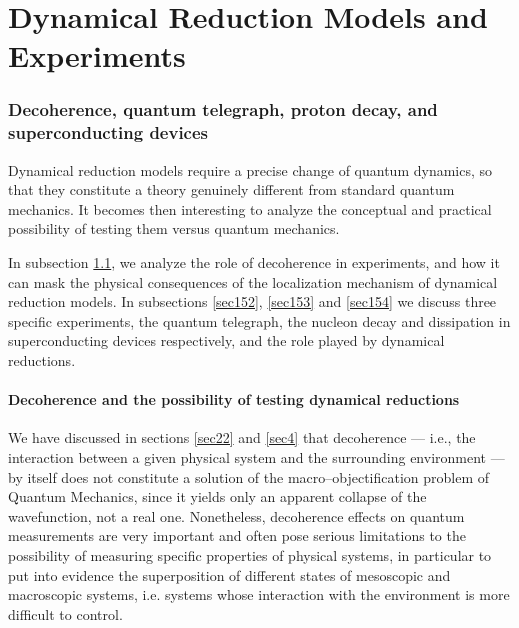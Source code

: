 \documentclass[10pt,a4paper]{article}
\begin{document}
\part{Dynamical Reduction Models and Experiments}

\section{Decoherence, quantum telegraph, proton decay, and
superconducting devices} \label{sec15}


Dynamical reduction models require a precise change of quantum
dynamics, so that they constitute a theory genuinely different
from standard quantum mechanics. It becomes then interesting to
analyze the conceptual and practical possibility of testing them
versus quantum mechanics.

In subsection \ref{sec151}, we analyze the role of decoherence in
experiments, and how it can mask the physical consequences of the
localization mechanism of dynamical reduction models. In
subsections \ref{sec152}, \ref{sec153} and  \ref{sec154} we
discuss three specific experiments, the quantum telegraph, the
nucleon decay and dissipation in superconducting devices
respectively, and the role played by dynamical reductions.


\subsection[Decoherence and dynamical reductions]{Decoherence and
the possibility of testing dynamical reductions} \label{sec151}

We have discussed in sections \ref{sec22} and \ref{sec4} that
decoherence --- i.e., the interaction between a given physical
system and the surrounding environment --- by itself does not
constitute a solution of the macro--objectification problem of
Quantum Mechanics, since it yields only an apparent collapse of
the wavefunction, not a real one. Nonetheless, decoherence effects
on quantum measurements are very important and often pose serious
limitations to the possibility of measuring specific properties of
physical systems, in particular to put into evidence the
superposition of different states of mesoscopic and macroscopic
systems, i.e. systems whose interaction with the environment is
more difficult to control.
\end{document}
